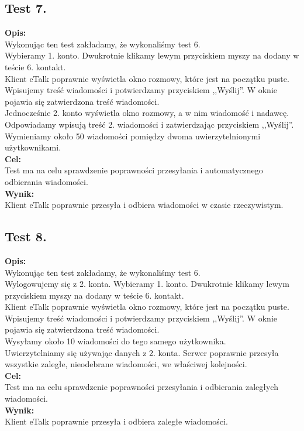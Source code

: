 \documentclass[a4paper,12pt]{article}
\begin{document}
\subsection[Test 7.]{Test 7.}
\textbf{Opis:}\\
Wykonując ten test zakładamy, że wykonaliśmy test 6.\\
Wybieramy 1. konto. Dwukrotnie klikamy lewym przyciskiem myszy na dodany w teście 6. kontakt.\\
Klient eTalk poprawnie wyświetla okno rozmowy, które jest na początku puste.
Wpisujemy treść wiadomości i potwierdzamy przyciskiem ,,Wyślij''. W oknie pojawia się zatwierdzona treść wiadomości.\\
Jednocześnie 2. konto wyświetla okno rozmowy, a w nim wiadomość i nadawcę. Odpowiadamy wpisują treść 2. wiadomości i zatwierdzając przyciskiem ,,Wyślij''.
Wymieniamy około 50 wiadomości pomiędzy dwoma uwierzytelnionymi użytkownikami.\\
\textbf{Cel:}\\
Test ma na celu sprawdzenie poprawności przesyłania i automatycznego odbierania wiadomości.\\
\textbf{Wynik:}\\
Klient eTalk poprawnie przesyła i odbiera wiadomości w czasie rzeczywistym.

\subsection[Test 8.]{Test 8.}
\textbf{Opis:}\\
Wykonując ten test zakładamy, że wykonaliśmy test 6.\\
Wylogowujemy się z 2. konta.
Wybieramy 1. konto. Dwukrotnie klikamy lewym przyciskiem myszy na dodany w teście 6. kontakt.\\
Klient eTalk poprawnie wyświetla okno rozmowy, które jest na początku puste.
Wpisujemy treść wiadomości i potwierdzamy przyciskiem ,,Wyślij''. W oknie pojawia się zatwierdzona treść wiadomości.\\
Wysyłamy około 10 wiadomości do tego samego użytkownika.\\
Uwierzytelniamy się używając danych z 2. konta. Serwer poprawnie przesyła wszystkie zaległe, nieodebrane wiadomości, we właściwej kolejności.\\
\textbf{Cel:}\\
Test ma na celu sprawdzenie poprawności przesyłania i odbierania zaległych wiadomości.\\
\textbf{Wynik:}\\
Klient eTalk poprawnie przesyła i odbiera zaległe wiadomości.
\end{document}

